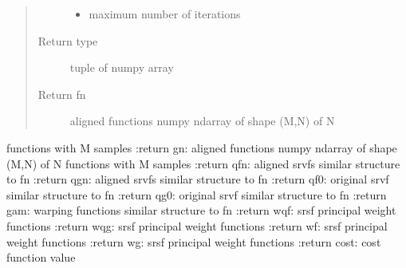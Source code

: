 \documentclass[letterpaper,10pt,english]{sphinxmanual}
\begin{document}
\begin{fulllineitems}
\begin{quote}
\begin{description}
\begin{itemize}
\item {} 
 \textendash{} maximum number of iterations

\end{itemize}

\item[{Return type}] \leavevmode
tuple of numpy array

\item[{Return fn}] \leavevmode
aligned functions \sphinxhyphen{} numpy ndarray of shape (M,N) of N

\end{description}\end{quote}

functions with M samples
:return gn: aligned functions \sphinxhyphen{} numpy ndarray of shape (M,N) of N
functions with M samples
:return qfn: aligned srvfs \sphinxhyphen{} similar structure to fn
:return qgn: aligned srvfs \sphinxhyphen{} similar structure to fn
:return qf0: original srvf \sphinxhyphen{} similar structure to fn
:return qg0: original srvf \sphinxhyphen{} similar structure to fn
:return gam: warping functions \sphinxhyphen{} similar structure to fn
:return wqf: srsf principal weight functions
:return wqg: srsf principal weight functions
:return wf: srsf principal weight functions
:return wg: srsf principal weight functions
:return cost: cost function value

\end{fulllineitems}

\end{document}
